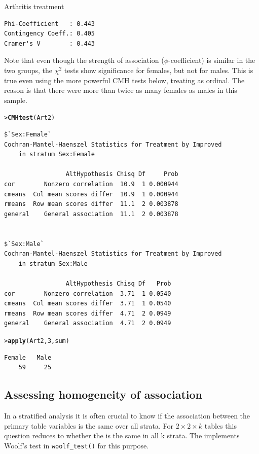 \documentclass[10pt,krantz2]{krantz}\usepackage[]{graphicx}\usepackage[]{color}
\makeatletter
\newcommand{\hlnum}[1]{\textcolor[rgb]{0.686,0.059,0.569}{#1}}%
\newcommand{\hlstd}[1]{\textcolor[rgb]{0.345,0.345,0.345}{#1}}%
\newcommand{\hlkwd}[1]{\textcolor[rgb]{0.737,0.353,0.396}{\textbf{#1}}}%
\newenvironment{kframe}{%
 \def\at@end@of@kframe{}%
 \ifinner\ifhmode%
  \def\at@end@of@kframe{\end{minipage}}%
  \begin{minipage}{\columnwidth}%
 \fi\fi%
 \def\FrameCommand##1{\hskip\@totalleftmargin \hskip-\fboxsep
 \colorbox{shadecolor}{##1}\hskip-\fboxsep
     \hskip-\linewidth \hskip-\@totalleftmargin \hskip\columnwidth}%
 \MakeFramed {\advance\hsize-\width
   \@totalleftmargin\z@ \linewidth\hsize
   \@setminipage}}%
 {\par\unskip\endMakeFramed%
 \at@end@of@kframe}
\newenvironment{knitrout}{}{} %
\renewenvironment{knitrout}{\small\renewcommand{\baselinestretch}{.85}}{} %
\makeatother
\begin{document}
\begin{Example}[arthrit3]{Arthritis treatment}
\begin{knitrout}
\begin{kframe}
\begin{verbatim}
Phi-Coefficient   : 0.443 
Contingency Coeff.: 0.405 
Cramer's V        : 0.443 
\end{verbatim}
\end{kframe}
\end{knitrout}
Note that even though the strength of association ($\phi$-coefficient)
is similar in the two groups, the $\chi^2$ tests show
significance for females, but not for males.
This is true even using the more powerful CMH tests below, treating
 as ordinal.  The reason is that there were more than
twice as many females as males in this sample.
\begin{knitrout}
\color{fgcolor}\begin{kframe}
\begin{alltt}
\hlstd{> }\hlkwd{CMHtest}\hlstd{(Art2)}
\end{alltt}
\begin{verbatim}
$`Sex:Female`
Cochran-Mantel-Haenszel Statistics for Treatment by Improved 
	in stratum Sex:Female 

                 AltHypothesis Chisq Df     Prob
cor        Nonzero correlation  10.9  1 0.000944
cmeans  Col mean scores differ  10.9  1 0.000944
rmeans  Row mean scores differ  11.1  2 0.003878
general    General association  11.1  2 0.003878


$`Sex:Male`
Cochran-Mantel-Haenszel Statistics for Treatment by Improved 
	in stratum Sex:Male 

                 AltHypothesis Chisq Df   Prob
cor        Nonzero correlation  3.71  1 0.0540
cmeans  Col mean scores differ  3.71  1 0.0540
rmeans  Row mean scores differ  4.71  2 0.0949
general    General association  4.71  2 0.0949
\end{verbatim}
\begin{alltt}
\hlstd{> }\hlkwd{apply}\hlstd{(Art2,} \hlnum{3}\hlstd{, sum)}
\end{alltt}
\begin{verbatim}
Female   Male 
    59     25 
\end{verbatim}
\end{kframe}
\end{knitrout}

\end{Example}

\subsection{Assessing homogeneity of association}\label{sec:twoway-homog}
In a stratified analysis
it is often  crucial to know if the association between the
primary table variables is the same over all strata.  For
\(2 \times  2 \times k\) tables this question reduces to whether the  is
the same in all k strata. The  implements
Woolf's test \citep{Woolf:1995} in \verb|woolf_test()|
for this purpose.
\end{document}
